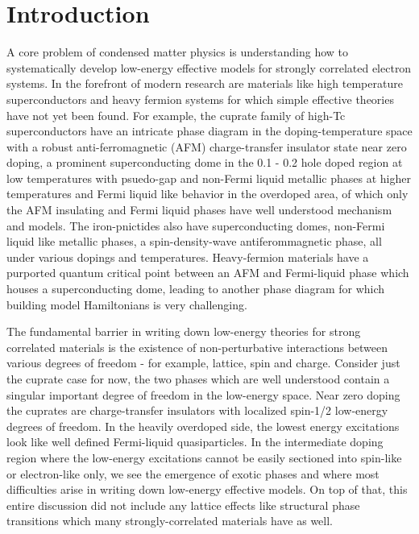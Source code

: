 \documentclass[12pt]{article}
\begin{document}
\section{Introduction}
A core problem of condensed matter physics is understanding how to systematically develop low-energy effective models for strongly correlated electron systems. In the forefront of modern research are materials like high temperature superconductors and heavy fermion systems for which simple effective theories have not yet been found. For example, the cuprate family of high-Tc superconductors have an intricate phase diagram in the doping-temperature space  with a robust anti-ferromagnetic (AFM) charge-transfer insulator state near zero doping, a prominent superconducting dome in the 0.1 - 0.2 hole doped region at low temperatures with psuedo-gap and non-Fermi liquid metallic phases at higher temperatures and Fermi liquid like behavior in the overdoped area, of which only the AFM insulating and Fermi liquid phases have well understood mechanism and models. The iron-pnictides also have superconducting domes, non-Fermi liquid like metallic phases, a spin-density-wave antiferommagnetic phase, all under various dopings and temperatures. Heavy-fermion materials have a purported quantum critical point between an AFM and Fermi-liquid phase which houses a superconducting dome, leading to another phase diagram for which building model Hamiltonians is very challenging. 

The fundamental barrier in writing down low-energy theories for strong correlated materials is the existence of non-perturbative interactions between various degrees of freedom - for example, lattice, spin and charge. Consider just the cuprate case for now, the two phases which are well understood contain a singular important degree of freedom in the low-energy space. Near zero doping the cuprates are charge-transfer insulators with localized spin-1/2 low-energy degrees of freedom. In the heavily overdoped side, the lowest energy excitations look like well defined Fermi-liquid quasiparticles. In the intermediate doping region where the low-energy excitations cannot be easily sectioned into spin-like or electron-like only, we see the emergence of exotic phases and where most difficulties arise in writing down low-energy effective models. On top of that, this entire discussion did not include any lattice effects like structural phase transitions which many strongly-correlated materials have as well.
\end{document}
